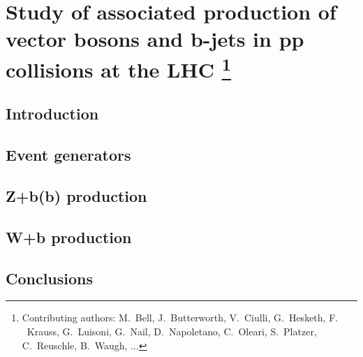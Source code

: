 \documentclass[11pt]{cernrep} \usepackage{graphicx,epsfig} 
\begin{document}
\section{Study of associated production of vector bosons and b-jets in
  pp collisions at the LHC \protect\footnote{Contributing authors:
    M.~Bell, J.~Butterworth,  V.~Ciulli,
    G.~Hesketh, F. ~Krauss, G.~Luisoni, G.~Nail, D.~Napoletano,
    C.~Oleari, S.~Platzer, C.~Reuschle, B.~Waugh, ... }}

\subsection{Introduction}

\subsection{Event generators}

\subsection{Z+b(b) production}

\subsection{W+b production}

\subsection{Conclusions}


\end{document}
